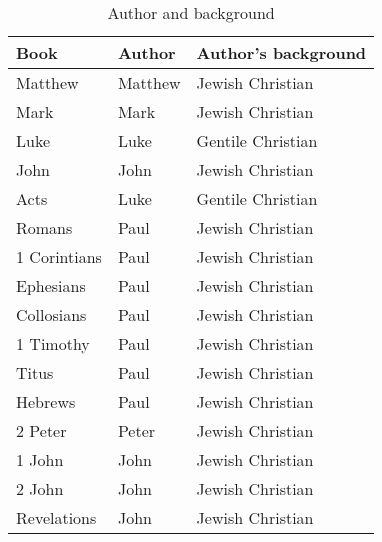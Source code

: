 \documentclass{article}
\begin{document}
\begin{table}
    \centering
    \begin{tabular}{lll}
    \toprule
        Book & Author & Author's background\\
    \midrule
        Matthew & Matthew & Jewish Christian \\
        Mark & Mark & Jewish Christian \\
        Luke & Luke & Gentile Christian \\
        John & John & Jewish Christian \\
        Acts & Luke & Gentile Christian \\
        Romans & Paul & Jewish Christian \\
        1 Corintians & Paul & Jewish Christian \\
        Ephesians & Paul & Jewish Christian \\
        Collosians & Paul & Jewish Christian \\
        1 Timothy & Paul & Jewish Christian \\
        Titus & Paul & Jewish Christian \\
        Hebrews & Paul & Jewish Christian \\
        2 Peter & Peter & Jewish Christian \\
        1 John & John & Jewish Christian \\
        2 John & John & Jewish Christian \\
        Revelations & John & Jewish Christian \\
    \bottomrule
    \end{tabular}
    \caption{Author and background}
    \label{author}
\end{table}
\end{document}
